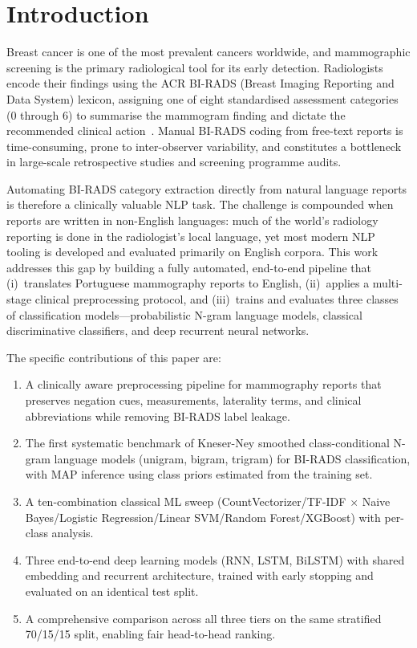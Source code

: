 \documentclass[11pt,a4paper]{article}
\begin{document}
\section{Introduction}

Breast cancer is one of the most prevalent cancers worldwide, and mammographic
screening is the primary radiological tool for its early detection.
Radiologists encode their findings using the ACR BI-RADS (Breast Imaging
Reporting and Data System) lexicon, assigning one of eight standardised
assessment categories (0 through 6) to summarise the mammogram finding and
dictate the recommended clinical action~\cite{acr2013}.
Manual BI-RADS coding from free-text reports is time-consuming, prone to
inter-observer variability, and constitutes a bottleneck in large-scale
retrospective studies and screening programme audits.

Automating BI-RADS category extraction directly from natural language reports
is therefore a clinically valuable NLP task.
The challenge is compounded when reports are written in non-English languages:
much of the world's radiology reporting is done in the radiologist's local
language, yet most modern NLP tooling is developed and evaluated primarily on
English corpora.
This work addresses this gap by building a fully automated, end-to-end pipeline
that (i)~translates Portuguese mammography reports to English, (ii)~applies a
multi-stage clinical preprocessing protocol, and (iii)~trains and evaluates
three classes of classification models---probabilistic N-gram language models,
classical discriminative classifiers, and deep recurrent neural networks.

The specific contributions of this paper are:

\begin{enumerate}[label=(\roman*)]
  \item A clinically aware preprocessing pipeline for mammography reports that
        preserves negation cues, measurements, laterality terms, and
        clinical abbreviations while removing BI-RADS label leakage.
  \item The first systematic benchmark of Kneser-Ney smoothed class-conditional
        N-gram language models (unigram, bigram, trigram) for BI-RADS
        classification, with MAP inference using class priors estimated from
        the training set.
  \item A ten-combination classical ML sweep (CountVectorizer/TF-IDF $\times$
        Naive Bayes/Logistic Regression/Linear SVM/Random Forest/XGBoost)
        with per-class analysis.
  \item Three end-to-end deep learning models (RNN, LSTM, BiLSTM) with
        shared embedding and recurrent architecture, trained with early stopping
        and evaluated on an identical test split.
  \item A comprehensive comparison across all three tiers on the same
        stratified 70/15/15 split, enabling fair head-to-head ranking.
\end{enumerate}
\end{document}
